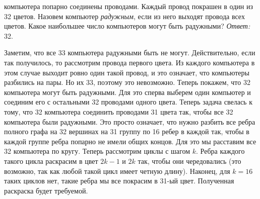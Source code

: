  компьютера попарно соединены проводами.
Каждый провод покрашен в один из 32 цветов.
Назовем компьютер \emph{радужным}, если из него выходят провода всех цветов.
Какое наибольшее число компьютеров могут быть радужными?
\solution
\emph{Ответ:} 32.
\par
Заметим, что все 33 компьютера радужными быть не могут.
Действительно, если так получилось, то рассмотрим провода первого цвета.
Из каждого компьютера в этом случае выходит ровно один такой провод, и это
означает, что компьютеры разбились на пары.
Но их 33, поэтому это невозможно.
Теперь покажем, что 32 компьютера могут быть радужными.
Для это сперва выберем один компьютер и соединим его с остальными 32 проводами
одного цвета.
Теперь задача свелась к тому, что 32 компьютера соединить проводами 31 цвета
так, чтобы все 32 компьютера были радужными.
Это просто означает, что нужно разбить все ребра полного графа на 32 вершинах
на 31 группу по 16 ребер в каждой так, чтобы в каждой группе ребра попарно не
имели общих концов.
Для это мы расставим все 32 компьютера по кругу.
Теперь рассмотрим циклы с шагом $k$.
Ребра каждого такого цикла раскрасим в цвет $2 k - 1$ и $2 k$ так, чтобы они
чередовались (это возможно, так как любой такой цикл имеет четную длину).
Наконец, для $k = 16$ таких циклов нет, такие ребра мы все покрасим в 31-ый
цвет.
Полученная раскраска будет требуемой.
\endproblem
